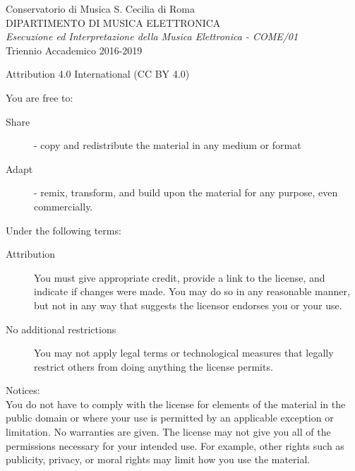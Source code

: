 

\thispagestyle{empty}

Conservatorio di Musica S. Cecilia di Roma \\
DIPARTIMENTO DI MUSICA ELETTRONICA \\
\emph{Esecuzione ed Interpretazione della Musica Elettronica - COME/01} \\
Triennio Accademico 2016-2019
\vfill

Attribution 4.0 International (CC BY 4.0)

You are free to:
\begin{description}
	\item[Share] - copy and redistribute the material in any medium or format
	\item[Adapt] - remix, transform, and build upon the material for any purpose, even commercially.
\end{description}

Under the following terms:
\begin{description}
	\item[Attribution] You must give appropriate credit, provide a link to the license, and indicate if
	changes were made. You may do so in any reasonable manner, but not in any way that suggests the licensor
	endorses you or your use.
	\item[No additional restrictions] You may not apply legal terms or technological measures that legally
	restrict others from doing anything the license permits.
\end{description}

Notices:\\
You do not have to comply with the license for elements of the material in the public domain or where your
use is permitted by an applicable exception or limitation. No warranties are given. The license may not give
you all of the permissions necessary for your intended use. For example, other rights such as publicity,
privacy, or moral rights may limit how you use the material.

\clearpage
